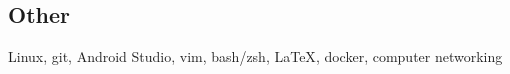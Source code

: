 \documentclass[../Resume.tex]{subfiles}
\begin{document}
	\subsection{Other}
	Linux, git, Android Studio, vim, bash/zsh, {\LaTeX}, docker, computer networking
	\vspace*{-4mm}
\end{document}
